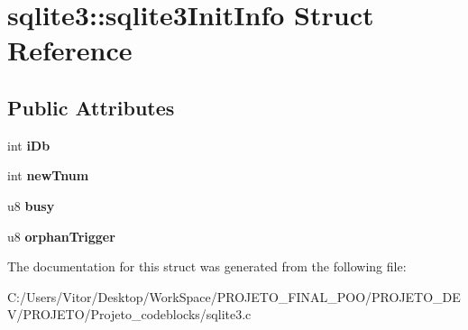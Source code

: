 \hypertarget{structsqlite3_1_1sqlite3_init_info}{\section{sqlite3\-:\-:sqlite3\-Init\-Info Struct Reference}
\label{structsqlite3_1_1sqlite3_init_info}
}
\subsection*{Public Attributes}
\begin{DoxyCompactItemize}
\item 
\hypertarget{structsqlite3_1_1sqlite3_init_info_a1dd98d805ac1ba2c0fe4d911d0639927}{int {\bfseries i\-Db}}\label{structsqlite3_1_1sqlite3_init_info_a1dd98d805ac1ba2c0fe4d911d0639927}

\item 
\hypertarget{structsqlite3_1_1sqlite3_init_info_a65250c8c5f215989e64294ede6c1c268}{int {\bfseries new\-Tnum}}\label{structsqlite3_1_1sqlite3_init_info_a65250c8c5f215989e64294ede6c1c268}

\item 
\hypertarget{structsqlite3_1_1sqlite3_init_info_a6ac01842e0ae68023cb60fea93bd8688}{u8 {\bfseries busy}}\label{structsqlite3_1_1sqlite3_init_info_a6ac01842e0ae68023cb60fea93bd8688}

\item 
\hypertarget{structsqlite3_1_1sqlite3_init_info_ac292839cc81d109206133a80949c45a6}{u8 {\bfseries orphan\-Trigger}}\label{structsqlite3_1_1sqlite3_init_info_ac292839cc81d109206133a80949c45a6}

\end{DoxyCompactItemize}


The documentation for this struct was generated from the following file\-:\begin{DoxyCompactItemize}
\item 
C\-:/\-Users/\-Vitor/\-Desktop/\-Work\-Space/\-P\-R\-O\-J\-E\-T\-O\-\_\-\-F\-I\-N\-A\-L\-\_\-\-P\-O\-O/\-P\-R\-O\-J\-E\-T\-O\-\_\-\-D\-E\-V/\-P\-R\-O\-J\-E\-T\-O/\-Projeto\-\_\-codeblocks/sqlite3.\-c\end{DoxyCompactItemize}
